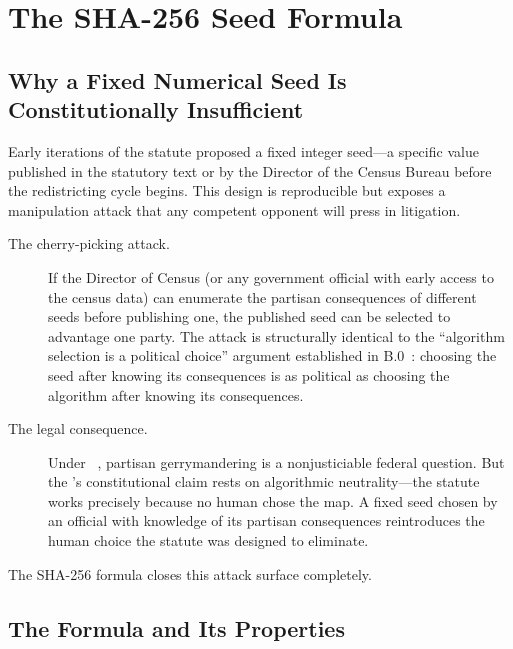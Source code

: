 \section{The SHA-256 Seed Formula}
\label{sec:sha256}

\subsection{Why a Fixed Numerical Seed Is Constitutionally Insufficient}

Early iterations of the \dia{} statute proposed a fixed integer seed---a
specific value published in the statutory text or by the Director of the Census
Bureau before the redistricting cycle begins.
This design is reproducible but exposes a manipulation attack that any
competent opponent will press in litigation.

\begin{description}
\item[The cherry-picking attack.]
If the Director of Census (or any government official with early access to the
census data) can enumerate the partisan consequences of different seeds before
publishing one, the published seed can be selected to advantage one party.
The attack is structurally identical to the ``algorithm selection is a
political choice'' argument established in B.0~\citep{b0paper}: choosing the
seed after knowing its consequences is as political as choosing the algorithm
after knowing its consequences.

\item[The legal consequence.]
Under \rucho{}~\citep{rucho2019}, partisan gerrymandering is a nonjusticiable
federal question.
But the \dia{}'s constitutional claim rests on algorithmic neutrality---the
statute works precisely because no human chose the map.
A fixed seed chosen by an official with knowledge of its partisan consequences
reintroduces the human choice the statute was designed to eliminate.
\end{description}

The SHA-256 formula closes this attack surface completely.

\subsection{The Formula and Its Properties}

